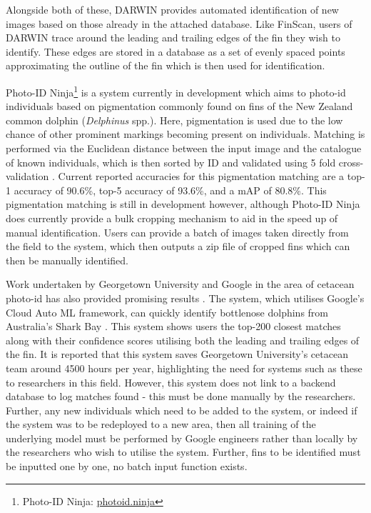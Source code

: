Alongside both of these, DARWIN \cite{hale_unsupervised_2012} provides automated identification of new images based on those already in the attached database. Like FinScan, users of DARWIN trace around the leading and trailing edges of the fin they wish to identify. These edges are stored in a database as a set of evenly spaced points approximating the outline of the fin which is then used for identification.

Photo-ID Ninja\footnote{Photo-ID Ninja: \href{http://photoid.ninja}{photoid.ninja}} is a system currently in development which aims to photo-id individuals based on pigmentation commonly found on fins of the New Zealand common dolphin (\textit{Delphinus} spp.)\cite{gilman_computer-assisted_2016}. Here, pigmentation is used due to the low chance of other prominent markings becoming present on individuals. Matching is performed via the Euclidean distance between the input image and the catalogue of known individuals, which is then sorted by ID and validated using 5 fold cross-validation \cite{bouma_individual_2018-1}. Current reported accuracies for this pigmentation matching are a top-1 accuracy of 90.6\%, top-5 accuracy of 93.6\%, and a mAP of 80.8\%. This pigmentation matching is still in development however, although Photo-ID Ninja does currently provide a bulk cropping mechanism to aid in the speed up of manual identification. Users can provide a batch of images taken directly from the field to the system, which then outputs a zip file of cropped fins which can then be manually identified. 

Work undertaken by Georgetown University and Google in the area of cetacean photo-id has also provided promising results \cite{mann_mann-urian-google_2019, georgetown_university_is_2018, liang_googles_2018}. The system, which utilises Google's Cloud Auto ML framework, can quickly identify bottlenose dolphins from Australia's Shark Bay . This system shows users the top-200 closest matches along with their confidence scores utilising both the leading and trailing edges of the fin. It is reported that this system saves Georgetown University's cetacean team around 4500 hours per year, highlighting the need for systems such as these to researchers in this field. However, this system does not link to a backend database to log matches found - this must be done manually by the researchers. Further, any new individuals which need to be added to the system, or indeed if the system was to be redeployed to a new area, then all training of the underlying model must be performed by Google engineers rather than locally by the researchers who wish to utilise the system. Further, fins to be identified must be inputted one by one, no batch input function exists.  

